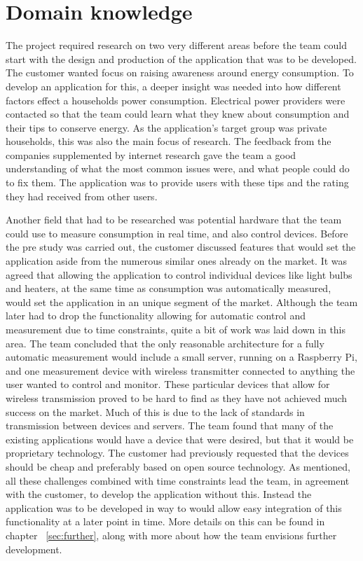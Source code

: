 \section{Domain knowledge}
The project required research on two very different areas before the team could start with the design and production of the application that was to be developed. The customer wanted focus on raising awareness around energy consumption. To develop an application for this, a deeper insight was needed into how different factors effect a households  power consumption. Electrical power providers were contacted so that the team could learn what they knew about consumption and their tips to conserve energy. As the application's target group was private households, this was also the main focus of research. The feedback from the companies supplemented by internet research gave the team a good understanding of what the most common issues were, and what people could do to fix them. The application was to provide users with these tips and the rating they had received from other users. 

Another field that had to be researched was potential hardware that the team could use to measure consumption in real time, and also control devices. Before the pre study was carried out, the customer discussed features that would set the application aside from the numerous similar ones already on the market. It was agreed that allowing the application to control individual devices like light bulbs and heaters, at the same time as consumption was automatically measured, would set the application in an unique segment of the market. Although the team later had to drop the functionality allowing for automatic control and measurement due to time constraints, quite a bit of work was laid down in this area. The team concluded that the only reasonable architecture for a fully automatic measurement would include a small server, running on a Raspberry Pi, and one measurement device with wireless transmitter connected to anything the user wanted to control and monitor. These particular devices that allow for wireless transmission proved to be hard to find as they have not achieved much success on the market. Much of this is due to the lack of standards in transmission between devices and servers. The team found that many of the existing applications would have a device that were desired, but that it would be proprietary technology. The customer had previously requested that the devices should be cheap and preferably based on open source technology. As mentioned, all these challenges combined with time constraints lead the team, in agreement with the customer, to develop the application without  this. Instead the application was to be developed in way to would allow easy integration of this functionality at a later point in time. More details on this can be found in chapter ~\ref{sec:further}, along with more about how the team envisions further development. 